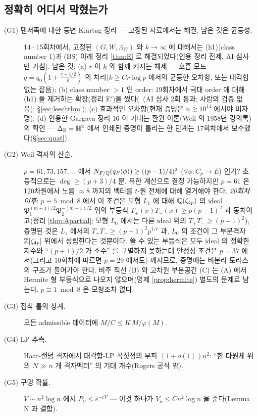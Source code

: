\subsection{정확히 어디서 막혔는가}
\begin{description}
\item[(G1) 텐서족에 대한 등변 Klartag 정리 --- 고정된 자료에서는 해결, 남은 것은 균등성.] 14·15회차에서, 고정된 $(G,W,\Lambda_W)$ 와 $k\to\infty$ 에 대해서는 (h1)(class number 1)과 (BS) 아래 정리 \ref{thm:E} 로 해결되었다(인용 정리 전제, AI 심사만 거침). 남은 것: (a) $r$ 이 $k$ 와 함께 커지는 체제 --- 호흡 모드 $q=q_0(1+\tfrac{r-1/2}k)$ 의 처리($k\ge Cr\log p$ 에서의 균등한 오차항, 또는 대각합 없는 잡음); (b) class number $>1$ 인 order: 19회차에서 극대 order 에 대해 (h1) 을 제거하는 확장(정리 E$'$)을 썼다(\tagPL\ (AI 심사 2회 통과; 사람의 검증 없음); \S\ref{sec:leechthm}); (c) 효과적인 오차항(현재 증명은 $n\gtrsim10^{14}$ 에서야 비자명); (d) 인용한 Gargava 정리 16 이 기대는 환원 이론(Weil 의 1958년 강의록)의 확인 --- $\Delta_{\mathbb{R}}=\mathbb{H}^2$ 에서 인쇄된 증명이 틀리는 한 단계는 17회차에서 보수했다(\S\ref{sec:quat}).
\item[(G2) Weil 격자의 산술.] $p=61,73,157,\dots$ 에서 $N_{F/\mathbb{Q}}(q_F(\phi))\ge((p-1)/4)^2$ ($\forall\phi:C_p\to E$) 인가? 초등적으로는 $\deg\ge(p+3)/4$ 뿐. 유한 계산으로 결정 가능하지만 $p=61$ 은 120차원에서 노름 $\approx8$ 까지의 벡터를 $t$-원 전체에 대해 열거해야 한다. \emph{20회차 이후}: $p\equiv5\bmod8$ 에서 이 조건은 모형 $L_1$ 에 대해 $\mathbb{Q}(\zeta_{4p})$ 의 ideal $\mathfrak P_1^{(m+1)/2}\mathfrak P_2^{-(m-1)/2}$ 위의 부등식 $T_+(x)T_-(x)\ge p(p-1)^2$ 과 동치이고(정리 \ref{thm:Apartial}; 모형 $L_0$ 에서는 다른 ideal 위의 $T_+T_-\ge(p-1)^2$), 증명된 것은 $L_1$ 에서의 $T_+T_-\ge(p-1)^2p^{1/r}$ 과, $L_0$ 의 조건이 그 부분격자 $\mathbb{Z}[\zeta_{4p}]$ 위에서 성립한다는 것뿐이다. 쓸 수 있는 부등식은 모두 ideal 의 정확한 지수와 ``$(p+1)/2$ 가 소수'' 를 구별하지 못하는데 안정성 조건은 $p=37$ 에서(그리고 10회차에 따르면 $p=29$ 에서도) 깨지므로, 증명에는 비분리 토러스의 구조가 들어가야 한다. 비주 직선 (B) 와 고차원 부분공간 (C) 는 (A) 에서 Hermite 형 부등식으로 나오지 않으며(명제 \ref{prop:hermite}) 별도의 문제로 남는다. $p\equiv1\bmod8$ 은 모형조차 없다.
\item[(G3) 접착 틀의 상계.] 모든 admissible 데이터에 $M/C\le K\,M/\varphi(M)$.
\item[(G4) LP 추측.] Haar-랜덤 격자에서 대각합-LP 꼭짓점의 부피 $(1+o(1))n^2$: ``한 타원체 위의 $N\gg n$ 개 격자벡터'' 의 기대 개수(Rogers 공식 밖).
\item[(G5) 구멍 확률.] $V\sim n^2\log n$ 에서 $P_V\le e^{-cV}$ --- 이것 하나가 $V_n\le Cn^2\log n$ 을 준다(Lemma N 과 결합).

\end{description}
